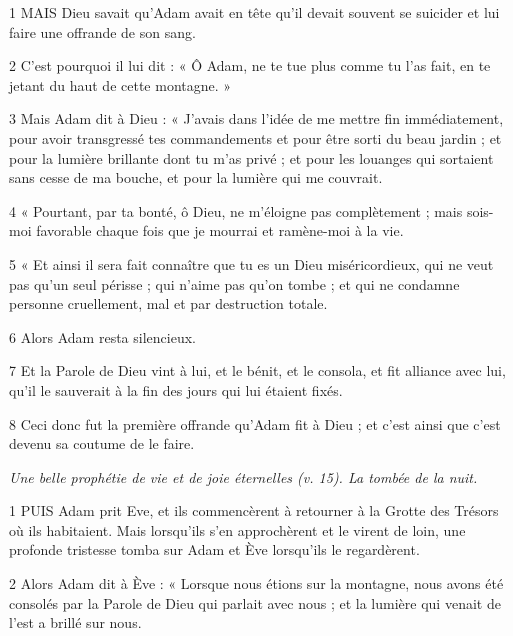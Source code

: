 \par 1 MAIS Dieu savait qu'Adam avait en tête qu'il devait souvent se suicider et lui faire une offrande de son sang.

\par 2 C'est pourquoi il lui dit : « Ô Adam, ne te tue plus comme tu l'as fait, en te jetant du haut de cette montagne. »

\par 3 Mais Adam dit à Dieu : « J'avais dans l'idée de me mettre fin immédiatement, pour avoir transgressé tes commandements et pour être sorti du beau jardin ; et pour la lumière brillante dont tu m'as privé ; et pour les louanges qui sortaient sans cesse de ma bouche, et pour la lumière qui me couvrait.

\par 4 « Pourtant, par ta bonté, ô Dieu, ne m'éloigne pas complètement ; mais sois-moi favorable chaque fois que je mourrai et ramène-moi à la vie.

\par 5 « Et ainsi il sera fait connaître que tu es un Dieu miséricordieux, qui ne veut pas qu'un seul périsse ; qui n'aime pas qu'on tombe ; et qui ne condamne personne cruellement, mal et par destruction totale.

\par 6 Alors Adam resta silencieux.

\par 7 Et la Parole de Dieu vint à lui, et le bénit, et le consola, et fit alliance avec lui, qu'il le sauverait à la fin des jours qui lui étaient fixés.

\par 8 Ceci donc fut la première offrande qu'Adam fit à Dieu ; et c'est ainsi que c'est devenu sa coutume de le faire.


\par \textit{Une belle prophétie de vie et de joie éternelles (v. 15). La tombée de la nuit.}

\par 1 PUIS Adam prit Eve, et ils commencèrent à retourner à la Grotte des Trésors où ils habitaient. Mais lorsqu’ils s’en approchèrent et le virent de loin, une profonde tristesse tomba sur Adam et Ève lorsqu’ils le regardèrent.

\par 2 Alors Adam dit à Ève : « Lorsque nous étions sur la montagne, nous avons été consolés par la Parole de Dieu qui parlait avec nous ; et la lumière qui venait de l’est a brillé sur nous.

